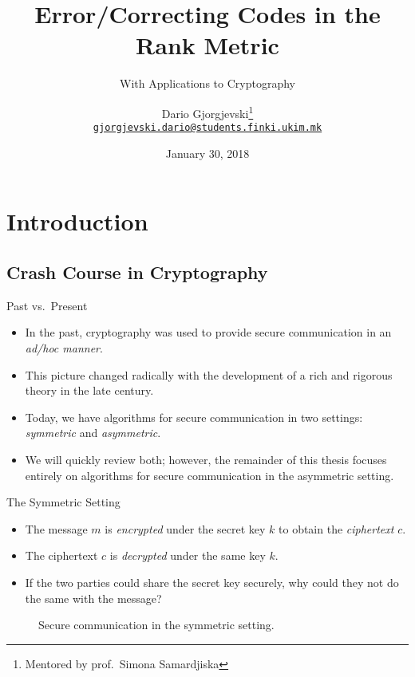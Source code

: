\documentclass[usepdftitle=false]{beamer}
\title{Error\-/Correcting Codes in the Rank Metric}
\subtitle{With Applications to Cryptography}
\author[Dario Gj.]{%
  Dario Gjorgjevski\thanks{Mentored by prof.\ Simona Samardjiska}\\%
  \href{mailto:gjorgjevski.dario@students.finki.ukim.mk}%
  {\nolinkurl{gjorgjevski.dario@students.finki.ukim.mk}}
}
\institute[FCSE]{%
  Faculty of Computer Science and Engineering\\%
  Ss.\ Cyril and Methodius University in Skopje
}
\date{January 30, 2018}
\newcommand*{\enc}{\ensuremath{\mathsf{Enc}}}
\newcommand*{\dec}{\ensuremath{\mathsf{Dec}}}
\begin{document}
\begin{frame}[plain]
  \addtocounter{framenumber}{-1}
  \titlepage%
\end{frame}

\section{Introduction}

\subsection{Crash Course in Cryptography}

\begin{frame}{Past vs.\ Present}
  \begin{itemize}
  \item In the past, cryptography was used to provide secure
    communication in an \emph{ad\-/hoc manner}.
  \item This picture changed radically with the development of a rich
    and rigorous theory in the late  century.
  \item Today, we have algorithms for secure communication in two
    settings: \emph{\alert{symmetric}} and \emph{\alert{asymmetric}}.
  \item We will quickly review both; however, the remainder of this
    thesis focuses entirely on algorithms for secure communication in
    the asymmetric setting.
  \end{itemize}
\end{frame}

\begin{frame}{The Symmetric Setting}
  \begin{itemize}
  \item The message \(m\) is \emph{encrypted} under the secret key
    \(k\) to obtain the \emph{ciphertext} \(c\).
  \item The ciphertext \(c\) is \emph{decrypted} under \alert{the same
      key} \(k\).
  \item If the two parties could share the secret key securely, why
    could they not do the same with the message?
  \end{itemize}
  \begin{figure}
    \centering
    \caption{Secure communication in the symmetric setting.}
  \end{figure}
\end{frame}
\end{document}
